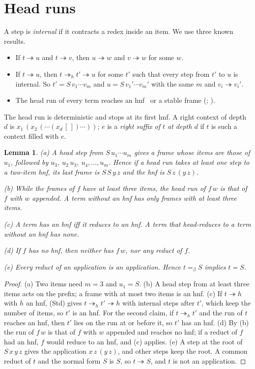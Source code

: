 \documentclass[11pt]{amsart}
\newtheorem{lemma}[theorem]{Lemma}
\theoremstyle{definition}
\newcommand{\red}{\twoheadrightarrow}
\newcommand{\hred}{\twoheadrightarrow_h}
\newcommand{\conv}{=_\beta}
\begin{document}
\section{Head runs}\label{sec:head}

A step is \emph{internal} if it contracts a redex inside an item. We use three known results.
\begin{itemize}
\item[(CR)] \citep{terese} If $t\red u$ and $t\red v$, then $u\red w$ and $v\red w$ for some $w$.
\item[(Std)] \citep{terese} If $t\red u$, then $t\hred t'\red u$ for some $t'$ such that every step
  from $t'$ to $u$ is internal. So $t'=S\,v_1\cdots v_m$ and $u=S\,v_1'\cdots v_m'$ with the same
  $m$ and $v_i\red v_i'$.
\item[(F2)] The head run of every term reaches an hnf~\citep[Theorem~9]{s1} or a stable frame
  (\citealp[Proposition~9(b)]{s3}; \citealp[Proposition~4]{s1}).
\end{itemize}
The head run is deterministic and stops at its first hnf. A right context of depth $d$ is
$x_1\,(x_2\,(\cdots(x_d\,[\,])\cdots))$; $e$ is a \emph{right suffix of $t$ at depth $d$} if $t$ is
such a context filled with $e$.

\begin{lemma}\label{lem:head}
\textup{(a)} A head step from $S\,u_1\cdots u_m$ gives a frame whose items are those of $u_1$,
followed by $u_3,\ u_2\,u_3,\ u_4,\dots,u_m$. Hence if a head run takes at least one step to a
two-item hnf, its last frame is $S\,S\,y\,z$ and the hnf is $S\,z\,(y\,z)$.

\textup{(b)} While the frames of $f$ have at least three items, the head run of $f\,w$ is that of $f$
with $w$ appended. A term without an hnf has only frames with at least three items.

\textup{(c)} A term has an hnf iff it reduces to an hnf. A term that head-reduces to a term without
an hnf has none.

\textup{(d)} If $f$ has no hnf, then neither has $f\,w$, nor any reduct of $f$.

\textup{(e)} Every reduct of an application is an application. Hence $t\conv S$ implies $t=S$.
\end{lemma}

\begin{proof}
(a) Two items need $m=3$ and $u_1=S$. (b) A head step from at least three items acts on the
prefix; a frame with at most two items is an hnf. (c) If $t\red h$ with $h$ an hnf, (Std) gives
$t\hred t'\red h$ with internal steps after $t'$, which keep the number of items, so $t'$ is an hnf.
For the second claim, if $t\hred t'$ and the run of $t$ reaches an hnf, then $t'$ lies on the run
at or before it, so $t'$ has an hnf.
(d) By (b) the run of $f\,w$ is that of $f$ with $w$ appended and reaches no hnf; if a reduct of
$f$ had an hnf, $f$ would reduce to an hnf, and (c) applies. (e) A step at the root of
$S\,x\,y\,z$ gives the application $x\,z\,(y\,z)$, and other steps keep the root. A common reduct of
$t$ and the normal form $S$ is $S$, so $t\red S$, and $t$ is not an application.
\end{proof}
\end{document}
